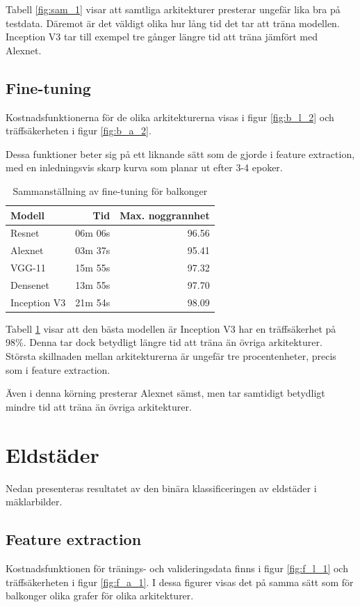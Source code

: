 \documentclass[]{kththesis}
\begin{document}
Tabell \ref{fig:sam_1} visar att samtliga arkitekturer presterar ungefär lika bra på testdata.
Däremot är det väldigt olika hur lång tid det tar att träna modellen. 
Inception V3 tar till exempel tre gånger längre tid att träna jämfört med Alexnet.

\subsection{Fine-tuning}
Kostnadsfunktionerna för de olika arkitekturerna visas i figur \ref{fig:b_l_2} och träffsäkerheten i figur \ref{fig:b_a_2}. 

Dessa funktioner beter sig på ett liknande sätt som de gjorde i feature extraction, med en inledningsvis skarp kurva som planar ut efter 3-4 epoker.

\begin{table}[!htbp]
  \centering
  \begin{tabular}{|l|r|r|}
    Modell & Tid & Max. noggrannhet \\ 
    \hline
    Resnet       & 06m 06s & 96.56 \\
    Alexnet      & 03m 37s & 95.41 \\
    VGG-11       & 15m 55s & 97.32 \\
    Densenet     & 13m 55s & 97.70 \\
    Inception V3 & 21m 54s & 98.09 \\
  \end{tabular}
  
  \caption{Sammanställning av fine-tuning för balkonger}
  \label{fig:sam_2}
  
\end{table}

Tabell \ref{fig:sam_2} visar att den bästa modellen är Inception V3 har en träffsäkerhet på 98\%. 
Denna tar dock betydligt längre tid att träna än övriga arkitekturer. 
Största skillnaden mellan arkitekturerna är ungefär tre procentenheter, precis som i feature extraction.

Även i denna körning presterar Alexnet sämst, men tar samtidigt betydligt mindre tid att träna än övriga arkitekturer.


\section{Eldstäder}
Nedan presenteras resultatet av den binära klassificeringen av eldstäder i mäklarbilder.


\subsection{Feature extraction}
Kostnadsfunktionen för tränings- och valideringsdata finns i figur \ref{fig:f_l_1} och träffsäkerheten i figur \ref{fig:f_a_1}.
I dessa figurer visas det på samma sätt som för balkonger olika grafer för olika arkitekturer.
\end{document}
